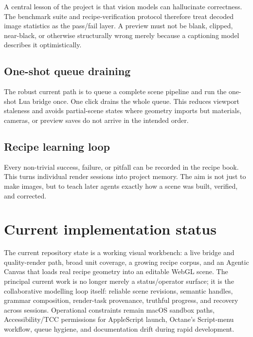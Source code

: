 \documentclass[11pt,a4paper]{article}
\begin{document}
A central lesson of the project is that vision models can hallucinate correctness. The benchmark suite and recipe-verification protocol therefore treat decoded image statistics as the pass/fail layer. A preview must not be blank, clipped, near-black, or otherwise structurally wrong merely because a captioning model describes it optimistically.

\subsection{One-shot queue draining}

The robust current path is to queue a complete scene pipeline and run the one-shot Lua bridge once. One click drains the whole queue. This reduces viewport staleness and avoids partial-scene states where geometry imports but materials, cameras, or preview saves do not arrive in the intended order.

\subsection{Recipe learning loop}

Every non-trivial success, failure, or pitfall can be recorded in the recipe book. This turns individual render sessions into project memory. The aim is not just to make images, but to teach later agents exactly how a scene was built, verified, and corrected.

\section{Current implementation status}

The current repository state is a working visual workbench: a live bridge and quality-render path, broad unit coverage, a growing recipe corpus, and an Agentic Canvas that loads real recipe geometry into an editable WebGL scene. The principal current work is no longer merely a status/operator surface; it is the collaborative modelling loop itself: reliable scene revisions, semantic handles, grammar composition, render-task provenance, truthful progress, and recovery across sessions. Operational constraints remain macOS sandbox paths, Accessibility/TCC permissions for AppleScript launch, Octane's Script-menu workflow, queue hygiene, and documentation drift during rapid development.
\end{document}

